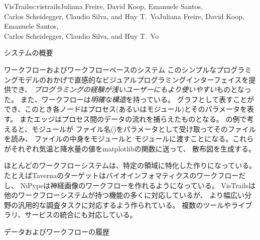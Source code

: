 \begin{aosachaptertoc}{VisTrails}{s:vistrails}{Juliana Freire, David Koop, Emanuele Santos, \\ Carlos Scheidegger, Claudio Silva, and Huy T.\ Vo}{Juliana Freire, David Koop, Emanuele Santos, \\ \hspace*{0.9cm} Carlos Scheidegger, Claudio Silva, and Huy T.\ Vo}
\begin{aosasect1}{システムの概要}
\begin{aosasect2}{ワークフローおよびワークフローベースのシステム}
このシンプルなプログラミングモデルのおかげで直感的なビジュアルプログラミングインターフェイスを提供でき、
\emph{プログラミングの経験が浅いユーザーにもより使いやすい}ものとなった。
また、ワークフローは\emph{明確な構造}を持っている。
グラフとして表すことができ、このとき各ノードはプロセス(あるいはモジュール)とそのパラメータを表す。
またエッジはプロセス間のデータの流れを捕らえたものとなる。
の例で考えると、モジュールが
ファイル名()をパラメータとして受け取ってそのファイルを読み、
ファイルの中身をモジュールと
モジュールに渡すことになる。これらがそれぞれ気温と降水量の値をmatplotlibの関数に送って、
散布図を生成する。

ほとんどのワークフローシステムは、特定の領域に特化した作りになっている。
たとえばTavernaのターゲットはバイオインフォマティクスのワークフローだし、
NiPypeは神経画像のワークフローを作れるようになっている。
VisTrailsは他のワークフローシステムが持つ機能の多くに対応しているが、
より幅広い分野の汎用的な調査タスクに対応するよう作られている。
複数のツールやライブラリ、サービスの統合にも対応している。

\end{aosasect2}

\begin{aosasect2}{データおよびワークフローの履歴}


\end{aosasect2}
\end{aosasect1}
\end{aosachaptertoc}
